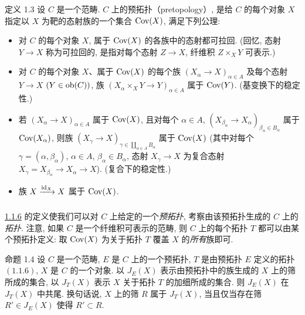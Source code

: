 \begin{enonce*}{定义 1.3}
设 $C$ 是一个范畴.
$C$ 上的预拓扑（pretopology）, 是给 $C$ 的每个对象 $X$
指定以 $X$ 为靶的态射族的一个集合 $\operatorname{Cov}(X)$,
满足下列公理:
\begin{itemize}
\item[PT 0)] 对\pageoriginale{} $C$ 的每个对象 $X$,
属于 $\operatorname{Cov}(X)$ 的各族中的态射都可拉回.
(回忆, 态射 $Y\rightarrow X$ 称为可拉回的,
是指对每个态射 $Z\rightarrow X$, 纤维积 $Z\times_X Y$ 可表示.)

\item[PT 1)] 对 $C$ 的每个对象 $X$、属于 $\operatorname{Cov}(X)$ 的每个族
$(X_{\alpha}\rightarrow X)_{\alpha \in A}$
及每个态射 $Y\rightarrow X$ $(Y\in \operatorname{ob} (C))$,
族 $(X_{\alpha}\times_X Y\rightarrow Y)_{\alpha \in A}$ 属于 $\operatorname{Cov}(Y)$.
(基变换下的稳定性.)

\item[PT 2)] 若 $(X_{\alpha}\rightarrow X)_{\alpha \in A}$ 属于
$\operatorname{Cov}(X)$, 且对每个 $\alpha\in A$,
$(X_{\beta_{\alpha}}\rightarrow X_{\alpha})_{\beta_{\alpha}\in
  B_{\alpha}}$ 属于 $\operatorname{Cov}(X_{\alpha})$,
则族 $(X_\gamma\rightarrow X)_{\gamma\in \amalg_{\alpha\in A}B_{\alpha}}$
属于 $\operatorname{Cov}(X)$
(其中对每个 $\gamma=(\alpha,\beta_{\alpha})$, $\alpha\in A$,
$\beta_{\alpha}\in B_{\alpha}$,
态射 $X_\gamma\rightarrow X$ 为复合态射
$X_\gamma=X_{\beta_{\alpha}}\rightarrow
  X_{\alpha}\rightarrow X$). (复合下的稳定性.)

\item[PT 3)] 族 $X\xrightarrow{\operatorname{id}_X} X$ 属于 $\operatorname{Cov}(X)$.
\end{itemize}
\end{enonce*}

\setcounter{subsection}{3} \setcounter{subsubsection}{0}
\subsubsection{}

\hyperref[II.subsubsec1.1.6]{1.1.6} 的定义使我们可以对 $C$ 上给定的一个\emph{预拓扑},
考察由该预拓扑生成的 $C$ 上的\emph{拓扑}.
注意, 如果 $C$ 是一个纤维积可表示的范畴,
则 $C$ 上的每个拓扑 $T$ 都可以由某个预拓扑定义:
取 $\operatorname{Cov}(X)$ 为关于拓扑 $T$ 覆盖 $X$ 的\emph{所有}族即可.

\begin{enonce*}{命题 1.4}
设 $C$ 是一个范畴, $E$ 是 $C$ 上的一个预拓扑,
$T$ 是由预拓扑 $E$ 定义的拓扑
$(\hyperref[II.subsubsec1.1.6]{1.1.6})$, $X$ 是 $C$ 的一个对象.
以 $J_E(X)$ 表示由预拓扑中的族生成的 $X$ 上的筛所成的集合,
以 $J_T(X)$ 表示 $X$ 关于\pageoriginale{}拓扑 $T$ 的加细所成的集合.
则 $J_E(X)$ 在 $J_T(X)$ 中共尾.
换句话说, $X$ 上的筛 $R$ 属于 $J_T(X)$,
当且仅当存在筛 $R'\in J_E(X)$ 使得 $R'\subset R$.
\end{enonce*}

